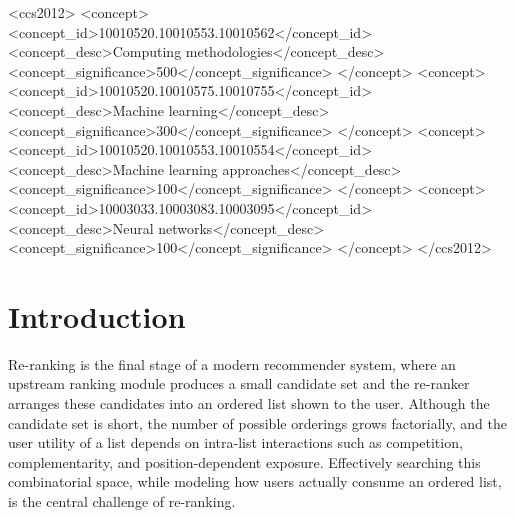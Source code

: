 \documentclass[sigconf]{acmart}
\begin{document}


\begin{CCSXML}
<ccs2012>
 <concept>
  <concept_id>10010520.10010553.10010562</concept_id>
  <concept_desc>Computing methodologies</concept_desc>
  <concept_significance>500</concept_significance>
 </concept>
 <concept>
  <concept_id>10010520.10010575.10010755</concept_id>
  <concept_desc>Machine learning</concept_desc>
  <concept_significance>300</concept_significance>
 </concept>
 <concept>
  <concept_id>10010520.10010553.10010554</concept_id>
  <concept_desc>Machine learning approaches</concept_desc>
  <concept_significance>100</concept_significance>
 </concept>
 <concept>
  <concept_id>10003033.10003083.10003095</concept_id>
  <concept_desc>Neural networks</concept_desc>
  <concept_significance>100</concept_significance>
 </concept>
</ccs2012>
\end{CCSXML}



\maketitle

\section{Introduction}

Re-ranking is the final stage of a modern recommender system, where an upstream ranking module produces a small candidate set and the re-ranker arranges these candidates into an ordered list shown to the user. Although the candidate set is short, the number of possible orderings grows factorially, and the user utility of a list depends on intra-list interactions such as competition, complementarity, and position-dependent exposure. Effectively searching this combinatorial space, while modeling how users actually consume an ordered list, is the central challenge of re-ranking.
\end{document}
